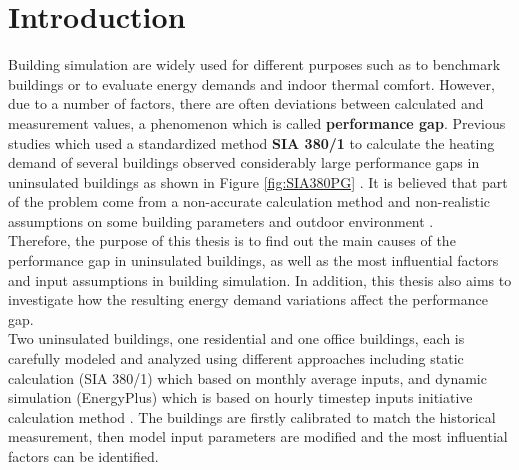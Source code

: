 \documentclass[a4paper, oneside]{discothesis}
\begin{document}
\tableofcontents

\mainmatter %

\chapter{Introduction}
	Building simulation are widely used for different purposes such as to benchmark buildings or to evaluate energy demands and indoor thermal comfort. However, due to a number of factors, there are often deviations between calculated  and measurement values, a phenomenon which is called \textbf{performance gap}. Previous studies which used a standardized method \textbf{SIA 380/1} to calculate the heating demand of several buildings observed considerably large performance gaps in uninsulated buildings as shown in Figure \ref{fig:SIA380PG} \cite{SIAPreviousreport}. It is believed that part of the problem come from a non-accurate calculation method and non-realistic assumptions on some building parameters and outdoor environment \cite{SIAPreviousreport}. \\

	
	Therefore, the purpose of this thesis is to find out the main causes of the performance gap in uninsulated buildings, as well as the most influential factors and input assumptions in building simulation. In addition, this thesis also aims to investigate how the resulting energy demand variations affect the performance gap.\\


	Two uninsulated buildings, one residential and one office buildings, each is carefully modeled and analyzed using different approaches including static calculation (SIA 380/1) which based on monthly average inputs, and dynamic simulation (EnergyPlus) which is based on hourly timestep inputs initiative calculation method \cite{SIAPreviousreport,SIA2024Shop,crawley2000energy}. The buildings are firstly calibrated to match the historical measurement, then model input parameters are modified and the most influential factors can be identified.\\
\end{document}

